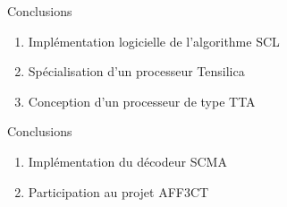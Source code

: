 \begin{frame}[c]{Conclusions}

  \begin{enumerate}
\renewcommand{\section}[2]{} %

    \renewcommand*{\bibfont}{\scriptsize}
    \nocite{leonardon_fast_2017,ghaffari_improving_2017,leonardon_tta_2018,Ghaffari2018,cassagne_fast_2017,cassagne_gdr_2017}
    \vfill
    \item<+-> Implémentation logicielle de l'algorithme  SCL
    \scriptsize{\printbibliography[keyword={fast-scl}]}
    \vfill
    \item<+-> Spécialisation d'un processeur Tensilica
    \scriptsize{\printbibliography[keyword={leonardon}]}
    \vfill
    \item<+-> Conception d'un processeur de type TTA
    \scriptsize{\printbibliography[keyword={tta}]}
    \vfill
  \end{enumerate}

\end{frame}

\begin{frame}[c]{Conclusions}

  \begin{enumerate}
\renewcommand{\section}[2]{} %

    \renewcommand*{\bibfont}{\scriptsize}
    \nocite{leonardon_fast_2017,ghaffari_improving_2017,leonardon_tta_2018,Ghaffari2018,cassagne_fast_2017,cassagne_gdr_2017}
    \vfill
    \item<+-> Implémentation du décodeur SCMA
    \printbibliography[keyword={ghaffari}]
    \vfill
    \item<+-> Participation au projet AFF3CT
    \printbibliography[keyword={aff3ct}]
    \vfill
  \end{enumerate}

\end{frame}

